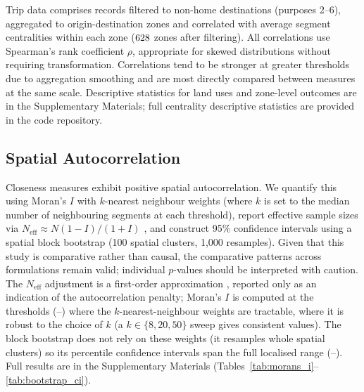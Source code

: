 Trip data comprises records filtered to non-home destinations (purposes 2--6), aggregated to origin-destination zones and correlated with average segment centralities within each zone ($628$ zones after filtering). All correlations use Spearman's rank coefficient $\rho$, appropriate for skewed distributions without requiring transformation. Correlations tend to be stronger at greater thresholds due to aggregation smoothing \cite{Fotheringham1991} and are most directly compared between measures at the same scale. Descriptive statistics for land uses and zone-level outcomes are in the Supplementary Materials; full centrality descriptive statistics are provided in the code repository.

\subsection{Spatial Autocorrelation}\label{sec:spatial_autocorr}

Closeness measures exhibit positive spatial autocorrelation. We quantify this using Moran's $I$ \cite{moran_notes_1950} with $k$-nearest neighbour weights (where $k$ is set to the median number of neighbouring segments at each threshold), report effective sample sizes via $N_{\text{eff}} \approx N(1-I)/(1+I)$ \cite{Clifford1989}, and construct 95\% confidence intervals using a spatial block bootstrap (100 spatial clusters, 1,000 resamples). Given that this study is comparative rather than causal, the comparative patterns across formulations remain valid; individual $p$-values should be interpreted with caution. The $N_{\text{eff}}$ adjustment is a first-order approximation \cite{Clifford1989}, reported only as an indication of the autocorrelation penalty; Moran's $I$ is computed at the thresholds (--) where the $k$-nearest-neighbour weights are tractable, where it is robust to the choice of $k$ (a $k\in\{8,20,50\}$ sweep gives consistent values). The block bootstrap does not rely on these weights (it resamples whole spatial clusters) so its percentile confidence intervals span the full localised range (--). Full results are in the Supplementary Materials (Tables~\ref{tab:morans_i}--\ref{tab:bootstrap_ci}).
